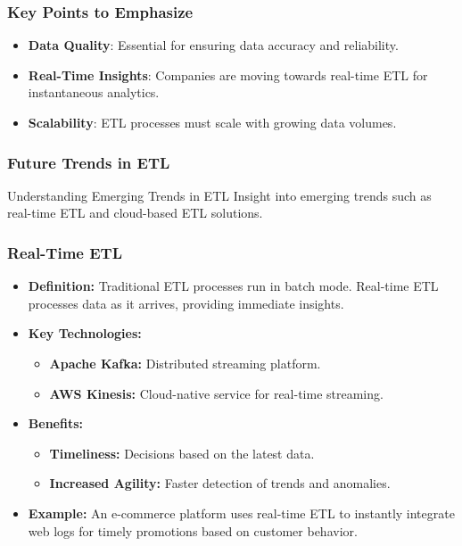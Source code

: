 \documentclass[aspectratio=169]{beamer}
\begin{document}
\begin{frame}
    \frametitle{Key Points to Emphasize}
    \begin{itemize}
        \item \textbf{Data Quality}: Essential for ensuring data accuracy and reliability.
        \item \textbf{Real-Time Insights}: Companies are moving towards real-time ETL for instantaneous analytics.
        \item \textbf{Scalability}: ETL processes must scale with growing data volumes.
    \end{itemize}
\end{frame}

\begin{frame}[fragile]
    \frametitle{Future Trends in ETL}
    \begin{block}{Understanding Emerging Trends in ETL}
        Insight into emerging trends such as real-time ETL and cloud-based ETL solutions.
    \end{block}
\end{frame}

\begin{frame}[fragile]
    \frametitle{Real-Time ETL}
    \begin{itemize}
        \item \textbf{Definition:}
            Traditional ETL processes run in batch mode. Real-time ETL processes data as it arrives, providing immediate insights.
        
        \item \textbf{Key Technologies:}
            \begin{itemize}
                \item \textbf{Apache Kafka:} Distributed streaming platform.
                \item \textbf{AWS Kinesis:} Cloud-native service for real-time streaming.
            \end{itemize}

        \item \textbf{Benefits:}
            \begin{itemize}
                \item \textbf{Timeliness:} Decisions based on the latest data.
                \item \textbf{Increased Agility:} Faster detection of trends and anomalies.
            \end{itemize}
        
        \item \textbf{Example:}
            An e-commerce platform uses real-time ETL to instantly integrate web logs for timely promotions based on customer behavior.
    \end{itemize}
\end{frame}
\end{document}
